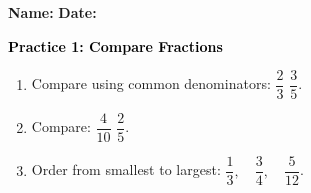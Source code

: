 \documentclass[12pt, letterpaper, fleqn]{article}
\newcommand{\blank}{\underline{\hspace{2.2cm}}}
\begin{document}
\textbf{Name:} \underline{\hspace{5cm}}
\hfill
\textbf{Date:} \underline{\hspace{3cm}}\\

\begin{tcolorbox}[colback=customteal!20]
    \large\textcolor{black}{\textbf{Practice 1: Compare Fractions}}
\end{tcolorbox}
\begin{enumerate}[itemsep=3.5cm, leftmargin=0.6cm]
\item Compare using common denominators: $\dfrac{2}{3}$ \blank $\dfrac{3}{5}$.
\vspace{3.5cm}
\item Compare: $\dfrac{4}{10}$ \blank $\dfrac{2}{5}$.
\vspace{3.5cm}
\item Order from smallest to largest: $\dfrac{1}{3}, \quad \dfrac{3}{4}, \quad \dfrac{5}{12}$.
\end{enumerate}
\end{document}
